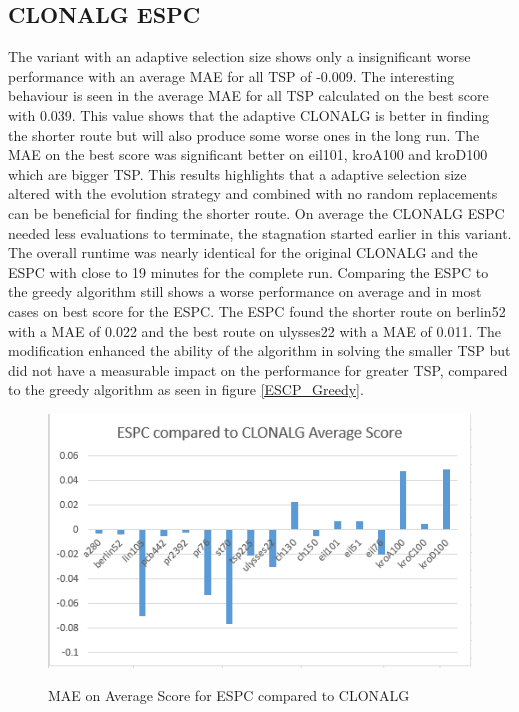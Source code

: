 \subsection{CLONALG ESPC}
The variant with an adaptive selection size shows only a insignificant worse performance with an average MAE for all TSP of -0.009. The interesting behaviour is seen in the average MAE for all TSP calculated on the best score with 0.039. This value shows that the adaptive CLONALG is better in finding the shorter route but will also produce some worse ones in the long run. The MAE on the best score was significant better on eil101, kroA100 and kroD100 which are bigger TSP. This results highlights that a adaptive selection size altered with the evolution strategy and combined with no random replacements can be beneficial for finding the shorter route. On average the CLONALG ESPC needed less evaluations to terminate, the stagnation started earlier in this variant. The overall runtime was nearly identical for the original CLONALG and the ESPC with close to 19 minutes for the complete run. Comparing the ESPC to the greedy algorithm still shows a worse performance on average and in most cases on best score for the ESPC. The ESPC found the shorter route on berlin52 with a MAE of 0.022 and the best route on ulysses22 with a MAE of 0.011. The modification enhanced the ability of the algorithm in solving the smaller TSP but did not have a measurable impact on the performance for greater TSP, compared to the greedy algorithm as seen in figure \ref{ESCP_Greedy}.\\
\begin{figure}[h]
\includegraphics[]{Images/ESPC_Fig_Avg.png}
\label{ESCP_AVG}
\caption{MAE on Average Score for ESPC compared to CLONALG}
\end{figure}
